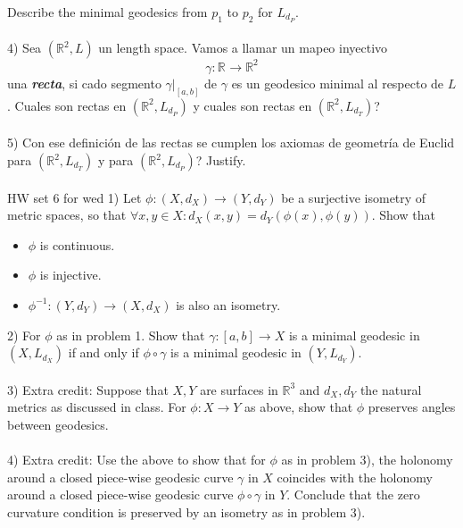 \documentclass{amsart}
\begin{document}
Describe the minimal geodesics from $p _{1}$  to $p _{2}$ for $L _{d _{P}}$. 
\\\\
4) Sea $(\mathbb{R} ^{2}, L) $ un length space. Vamos
a llamar un mapeo inyectivo $$\gamma: \mathbb{R} ^{} \to
\mathbb{R} ^{2} $$ una \textbf{\emph{recta}}, si cado segmento $\gamma | _{[a,b]}$ de $\gamma$ es un geodesico minimal al respecto de $L$. Cuales son rectas en $(\mathbb{R} ^{2}, L _{d _{P}}) $
y cuales son rectas en $(\mathbb{R} ^{2}, L _{d _{T}}) $?
\\\\
5) Con ese definición de las rectas se cumplen los axiomas de geometría de Euclid para $(\mathbb{R} ^{2}, L _{d _{T}}) $ y para $(\mathbb{R} ^{2}, L _{d _{P}}) $? Justify.
\\\\
HW set 6 for wed
1) Let $\phi: (X, d _{X}) \to (Y, d _{Y})$ be a surjective
isometry of metric spaces, so that $\forall x,y \in X:
d _{X} (x, y) = d _{Y} (\phi (x), \phi (y))$. Show that
\begin{itemize}
\item  $\phi $ is continuous.
\item  $\phi $ is injective.
\item $\phi ^{-1}: (Y, d _{Y}) \to (X, d _{X}) $ is also an
isometry.
\end{itemize}
2) For $\phi $ as in problem 1. Show that $\gamma: [a,b] \to
X$ is
a minimal geodesic in $(X, L _{d _{X}})$ if and only if
$\phi \circ \gamma $ is a minimal geodesic in $(Y, L _{d _{Y}})$.
\\\\
3) Extra credit: Suppose that $X,Y$ are surfaces in $\mathbb{R} ^{3} $ and $d _{X},
d _{Y}$ the natural metrics as discussed in class. For
$\phi: X \to Y $ as above, show that $\phi $ preserves angles between geodesics. 
\\\\
4) Extra credit: Use the above to show that for $\phi $ as
in problem 3), 
the holonomy around a closed piece-wise geodesic curve
$\gamma $ in $X$ coincides with the holonomy around a closed
piece-wise geodesic curve $\phi \circ \gamma $ in $Y$.
Conclude that the zero curvature condition is preserved by
an isometry as in problem 3).
\end{document}
